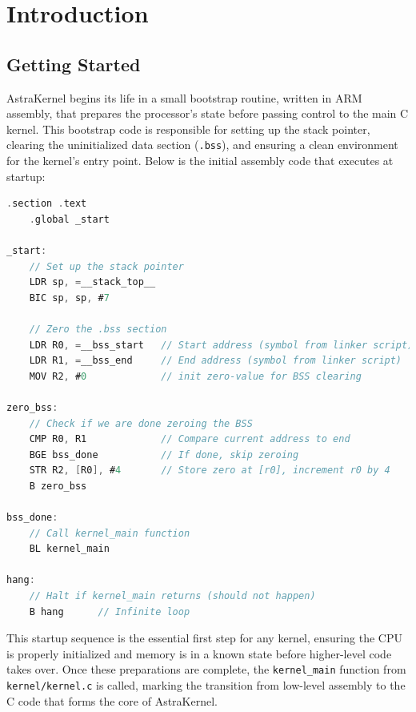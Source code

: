 \newpage
\chapter{Introduction}
\section{Getting Started}
AstraKernel begins its life in a small bootstrap routine, written in ARM assembly, 
that prepares the processor’s state before passing control to the main C kernel. 
This bootstrap code is responsible for setting up the stack pointer, clearing 
the uninitialized data section (\texttt{.bss}), and ensuring a clean environment 
for the kernel’s entry point. Below is the initial assembly code that executes 
at startup: \\

\begin{lstlisting}[language={C}, caption={Initial bootstrap code for AstraKernel.}, label={lst:bootstrap}]
    .section .text
    .global _start

_start:
    // Set up the stack pointer
    LDR sp, =__stack_top__
    BIC sp, sp, #7

    // Zero the .bss section
    LDR R0, =__bss_start   // Start address (symbol from linker script)
    LDR R1, =__bss_end     // End address (symbol from linker script)
    MOV R2, #0             // init zero-value for BSS clearing

zero_bss:
    // Check if we are done zeroing the BSS
    CMP R0, R1             // Compare current address to end
    BGE bss_done           // If done, skip zeroing
    STR R2, [R0], #4       // Store zero at [r0], increment r0 by 4
    B zero_bss

bss_done:
    // Call kernel_main function
    BL kernel_main

hang:
    // Halt if kernel_main returns (should not happen)
    B hang		// Infinite loop
\end{lstlisting}

This startup sequence is the essential first step for any kernel, ensuring the 
CPU is properly initialized and memory is in a known state before higher-level 
code takes over. Once these preparations are complete, the \texttt{kernel\_main} 
function from \texttt{kernel/kernel.c} is called, marking the transition from 
low-level assembly to the C code that forms the core of AstraKernel.

